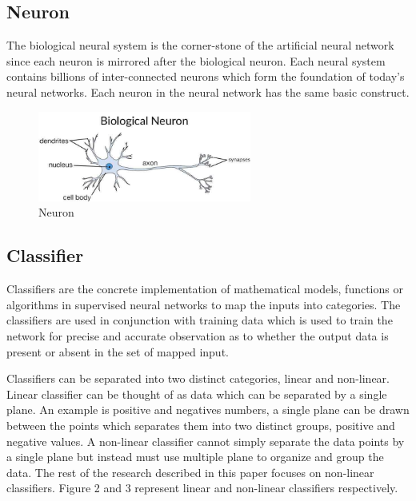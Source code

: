 \documentclass[journal]{IEEEtran}
\begin{document}
\subsection{Neuron}
The biological neural system is the corner-stone of the artificial neural network since each neuron is mirrored after the biological neuron.  Each neural system contains billions of inter-connected neurons which form the foundation of today's neural networks.  Each neuron in the neural network has the same basic construct.

\begin{figure}[h] %
 \centering
 \includegraphics[width=7cm]{neuron}
 \caption{Neuron}
\end{figure}

\subsection{Classifier}
Classifiers are the concrete implementation of mathematical models, functions or algorithms in supervised neural networks to map the inputs into categories.  The classifiers are used in conjunction with training data which is used to train the network for precise and accurate observation as to whether the output data is present or absent in the set of mapped input. 

Classifiers can be separated into two distinct categories, linear and non-linear.  Linear classifier can be thought of as data which can be separated by a single plane.  An example is positive and negatives numbers, a single plane can be drawn between the points which separates them into two distinct groups, positive and negative values.  A non-linear classifier cannot simply separate the data points by a single plane but instead must use multiple plane to organize and group the data.  The rest of the research described in this paper focuses on non-linear classifiers.  Figure 2 and 3 represent linear and non-linear classifiers respectively.
\end{document}
